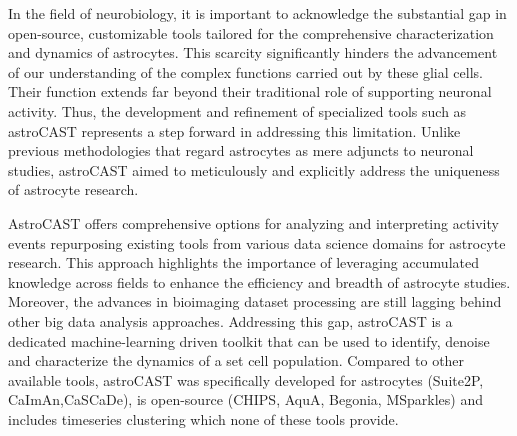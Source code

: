 In the field of neurobiology, it is important to acknowledge the substantial gap in open-source, customizable tools tailored for the comprehensive characterization and dynamics of astrocytes. This scarcity significantly hinders the advancement of our understanding of the complex functions carried out by these glial cells. Their function extends far beyond their traditional role of supporting neuronal activity\citep{montalant_role_2021,ransom_new_2003}. Thus, the development and refinement of specialized tools such as astroCAST represents a step forward in addressing this limitation. Unlike previous methodologies that regard astrocytes as mere adjuncts to neuronal studies, astroCAST aimed to meticulously and explicitly address the uniqueness of astrocyte research.

AstroCAST offers comprehensive options for analyzing and interpreting activity events repurposing existing tools from various data science domains for astrocyte research. This approach highlights the importance of leveraging accumulated knowledge across fields to enhance the efficiency and breadth of astrocyte studies. Moreover, the advances in bioimaging dataset processing are still lagging behind other big data analysis approaches. Addressing this gap, astroCAST is a dedicated machine-learning driven toolkit that can be used to identify, denoise and characterize the dynamics of a set cell population. Compared to other available tools, astroCAST was specifically developed for astrocytes (Suite2P\citep{pachitariu_suite2p_2017}, CaImAn\citep{giovannucci_caiman_2019},CaSCaDe\citep{rupprecht_database_2021}), is open-source (CHIPS\citep{barrett_chips_2018}, AquA\citep{wang_event-based_2018}, Begonia\citep{bjornstad_begoniatwo-photon_2021}, MSparkles\citep{stopper_novel_2022}) and includes timeseries clustering which none of these tools provide.

